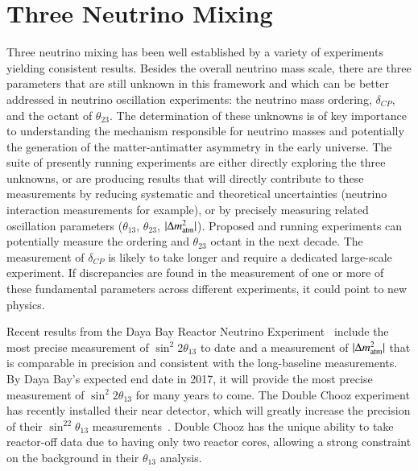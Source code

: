 \section{Three Neutrino Mixing}
\label{sec:3NuMixing}

Three neutrino mixing has been well established by a variety of
experiments yielding consistent results. Besides the overall neutrino
mass scale, there are three parameters that are still unknown in this
framework and which can be better addressed in neutrino oscillation
experiments: the neutrino mass ordering, $\delta_{CP}$, and the octant
of $\theta_{23}$.  The determination of these unknowns is of key
importance to understanding the mechanism responsible for neutrino
masses and potentially the generation of the matter-antimatter
asymmetry in the early universe.  The suite of presently running
experiments are either directly exploring the three unknowns, or are
producing results that will directly contribute to these measurements
by reducing systematic and theoretical uncertainties (neutrino
interaction measurements for example), or by precisely measuring
related oscillation parameters ($\theta_{13}$, $\theta_{23}$, $|\Delta
m^{2}_{\textnormal{atm}}|$).  Proposed and running experiments can
potentially measure the ordering and $\theta_{23}$ octant in the next
decade.  The measurement of $\delta_{CP}$ is likely to take longer and
require a dedicated large-scale experiment.  If discrepancies are
found in the measurement of one or more of these fundamental
parameters across different experiments, it could point to new
physics.

Recent results from the Daya Bay Reactor Neutrino
Experiment~\cite{Zhang:2015fya} include the most precise measurement
of $\sin^{2}2\theta_{13}$ to date and a measurement of $|\Delta
m^{2}_{\textnormal{atm}}|$ that is comparable in precision and
consistent with the long-baseline measurements.  By Daya Bay's
expected end date in 2017, it will provide the most precise
measurement of $\sin^{2}2\theta_{13}$ for many years to come.  The
Double Chooz experiment has recently installed their near detector,
which will greatly increase the precision of their
$\sin^22\theta_{13}$ measurements~\cite{Abe:2014bwa}. Double
Chooz has the unique ability to take reactor-off data due to having
only two reactor cores, allowing a strong constraint on the background
in their $\theta_{13}$ analysis.

